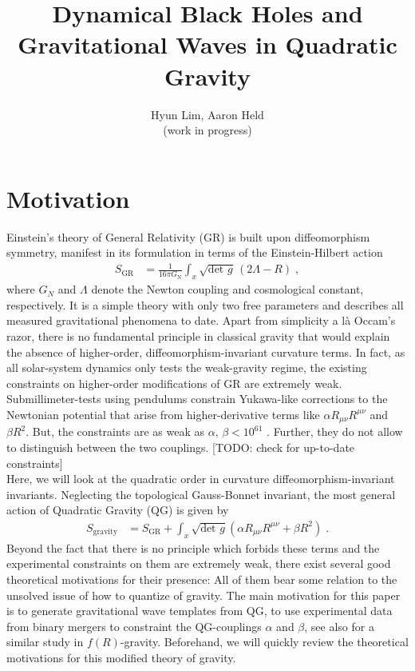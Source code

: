 \documentclass[a4paper,oneside,openany,11pt]{memoir}
\numberwithin{equation}{section} %
\newcommand{\TODO}[1]{{\color{red}[}{\color{red}TODO:} {\color{blue}#1}{\color{red}]}}
\begin{document}
\title{\HUGE Dynamical Black Holes and Gravitational Waves in Quadratic Gravity}

\author{Hyun Lim, Aaron Held\\(work in progress)}


\maketitle


\section{Motivation}

Einstein's theory of General Relativity (GR) is built upon diffeomorphism symmetry, manifest in its formulation in terms of the Einstein-Hilbert action
\begin{align}
    S_{\text{GR}} &=
 \frac1{16\pi G_\text{N}}\int_x \sqrt{\text{det } g}\, (2\Lambda-R)\;,
\end{align}
where $G_N$ and $\Lambda$ denote the Newton coupling and cosmological constant, respectively. It is a simple theory with only two free parameters and describes all measured gravitational phenomena to date. Apart from simplicity a l\`a Occam's razor, there is no fundamental principle in classical gravity that would explain the absence of higher-order, diffeomorphism-invariant curvature terms. In fact, as all solar-system dynamics only tests the weak-gravity regime, the existing constraints on higher-order modifications of GR are extremely weak. Submillimeter-tests using pendulums constrain Yukawa-like corrections to the Newtonian potential that arise from higher-derivative terms like $\alpha  R_{\mu\nu}R^{\mu\nu}$ and $\beta  R^2$. But, the constraints are as weak as $\alpha,\,\beta < 10^{61}$ \cite{Hoyle:2004cw, Calmet:2017rxl}. Further, they do not allow to distinguish between the two couplings. 
\TODO{check for up-to-date constraints}
\\
Here, we will look at the quadratic order in curvature diffeomorphism-invariant invariants. Neglecting the topological Gauss-Bonnet invariant, the most general action of Quadratic Gravity (QG) is given by
\begin{align}
    S_{\text{gravity}} &=
 S_\text{GR}
 + \int_x \sqrt{\text{det }g} \left(\alpha  R_{\mu\nu}R^{\mu\nu} + \beta  R^2\right)  \;. 
\end{align}
Beyond the fact that there is no principle which forbids these terms and the experimental constraints on them are extremely weak, there exist several good theoretical motivations for their presence: All of them bear some relation to the unsolved issue of how to quantize of gravity. The main motivation for this paper is to generate gravitational wave templates from QG, to use experimental data from binary mergers to constraint the QG-couplings $\alpha$ and $\beta$, see also \cite{Cao:2013osa} for a similar study in $f(R)$-gravity. Beforehand, we will quickly review the theoretical motivations for this modified theory of gravity.
\end{document}
